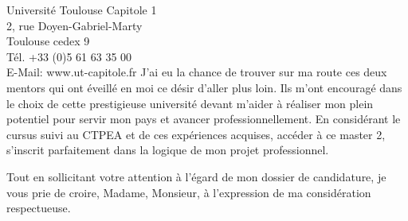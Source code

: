 \documentclass[12pt]{lettre}
\begin{document}
\begin{letter}{
Universit\'{e} Toulouse Capitole 1\\
2, rue Doyen-Gabriel-Marty\\
Toulouse cedex 9\\
T\'{e}l. +33 (0)5 61 63 35 00\\
E-Mail: www.ut-capitole.fr}
J'ai eu la chance de trouver sur ma route ces deux mentors qui ont \'{e}veill\'{e} en moi ce d\'{e}sir d'aller plus loin. Ils m'ont encourag\'{e} dans le choix de cette prestigieuse universit\'{e} devant m'aider \`{a} r\'{e}aliser mon plein potentiel pour servir mon pays et avancer professionnellement. En consid\'{e}rant le cursus  suivi au CTPEA et de ces exp\'{e}riences acquises, acc\'{e}der \`{a} ce master 2, s'inscrit parfaitement dans la logique de mon projet professionnel. 

\closing{Tout en  sollicitant votre attention \`{a} l'\'{e}gard de mon dossier de candidature, je vous prie de croire, Madame, Monsieur, \`{a} l'expression de ma consid\'{e}ration respectueuse.}
\end{letter}
\end{document}
